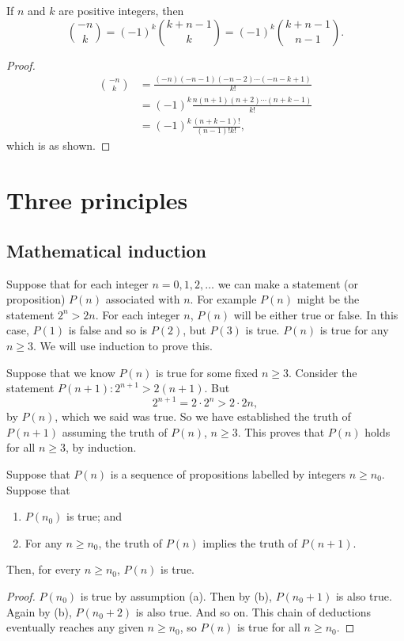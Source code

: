 \documentclass[10pt, a4paper]{article}
\begin{document}
\begin{proposition}
    If $n$ and $k$ are positive integers, then
    \[
    \binom{-n}{k} = (-1) ^ k \binom{k + n - 1}{k} = (-1) ^ k \binom{k + n - 1}{n - 1}.
    \]
    \begin{proof}
        \begin{align*}
            \binom{-n}{k} &= \frac{(-n)(-n - 1)(-n - 2)\dotsi(-n - k + 1)}{k!} \\
            &= (-1) ^ k\frac{n(n + 1)(n + 2)\dotsi(n + k - 1)}{k!} \\
            &= (-1) ^ k\frac{(n + k - 1)!}{(n - 1)!k!},
        \end{align*}
        which is as shown.
    \end{proof}
\end{proposition}

\newpage

\section{Three principles}

\subsection{Mathematical induction}
Suppose that for each integer $n = 0, 1, 2, \dotsc$ we can make a statement (or proposition) $P(n)$ associated with $n$.
For example $P(n)$ might be the statement $2 ^ n > 2n$.
For each integer $n$,
$P(n)$ will be either true or false.
In this case, $P(1)$ is false and so is $P(2)$,
but $P(3)$ is true.
$P(n)$ is true for any $n \geq 3$.
We will use induction to prove this.

Suppose that we know $P(n)$ is true for some fixed $n \geq 3$.
Consider the statement $P(n + 1) : 2 ^ {n + 1} > 2(n + 1)$.
But
\[
2 ^ {n + 1} = 2 \cdot 2 ^ n > 2 \cdot 2n,
\]
by $P(n)$, which we said was true.
So we have established the truth of $P(n + 1)$ assuming the truth of $P(n)$,
$n \geq 3$.
This proves that $P(n)$ holds for all $n \geq 3$,
by induction.

\begin{theorem}
    Suppose that $P(n)$ is a sequence of propositions labelled by integers $n \geq n_0$.
    Suppose that
    \begin{enumerate}[label = (\alph*)]
        \item $P(n_0)$ is true; and
        \item For any $n \geq n_0$, the truth of $P(n)$ implies the truth of $P(n + 1)$.
    \end{enumerate}
    Then, for every $n \geq n_0$,
    $P(n)$ is true.
    \begin{proof}
        $P(n_0)$ is true by assumption (a).
        Then by (b),
        $P(n_0 + 1)$ is also true.
        Again by (b),
        $P(n_0 + 2)$ is also true.
        And so on.
        This chain of deductions eventually reaches any given $n \geq n_0$,
        so $P(n)$ is true for all $n \geq n_0$.
    \end{proof}
\end{theorem}
\end{document}
